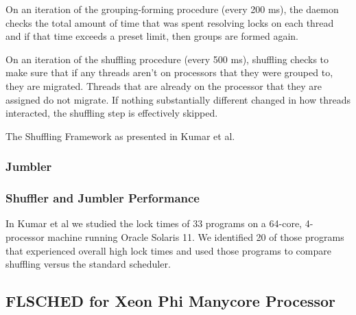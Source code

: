 \documentclass{sig-alternate}
\begin{document}
On an iteration of the grouping-forming procedure (every 200 ms), the daemon checks the total amount of time that was spent resolving locks on each thread and if that time exceeds a preset limit, then groups are formed again.

On an iteration of the shuffling procedure (every 500 ms), shuffling checks to make sure that if any threads aren't on processors that they were grouped to, they are migrated. Threads that are already on the processor that they are assigned do not migrate. If nothing substantially different changed in how threads interacted, the shuffling step is effectively skipped.~\cite{KumarEtal:2014}

\begin{algorithm}


	\caption{The Shuffling Framework
	as presented in Kumar et al.}\label{euclid}\label{alg:shuffler}
\end{algorithm}

\subsubsection{Jumbler}
\label{sec:jumbler}



\subsubsection{Shuffler and Jumbler Performance}
\label{sec:sj_performance}

In Kumar et al we studied the lock times of 33 programs on a 64-core, 4-processor machine running Oracle Solaris 11. We identified 20 of those programs that experienced overall high lock times and used those programs to compare shuffling versus the standard scheduler.



\subsection{FLSCHED for Xeon Phi Manycore Processor}
\label{sec:flsched}
\end{document}
